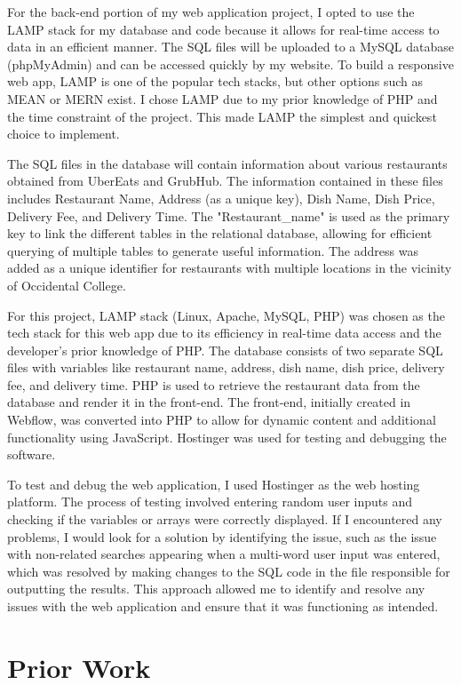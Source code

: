 \documentclass[10pt,twocolumn]{article}
\begin{document}
For the back-end portion of my web application project, I opted to use the LAMP stack for my database and code because it allows for real-time access to data in an efficient manner. The SQL files will be uploaded to a MySQL database (phpMyAdmin) and can be accessed quickly by my website. To build a responsive web app, LAMP is one of the popular tech stacks, but other options such as MEAN or MERN exist. I chose LAMP due to my prior knowledge of PHP and the time constraint of the project. This made LAMP the simplest and quickest choice to implement.

The SQL files in the database will contain information about various restaurants obtained from UberEats and GrubHub. The information contained in these files includes Restaurant Name, Address (as a unique key), Dish Name, Dish Price, Delivery Fee, and Delivery Time. The "Restaurant\_name" is used as the primary key to link the different tables in the relational database, allowing for efficient querying of multiple tables to generate useful information. The address was added as a unique identifier for restaurants with multiple locations in the vicinity of Occidental College.

For this project, LAMP stack (Linux, Apache, MySQL, PHP) was chosen as the tech stack for this web app due to its efficiency in real-time data access and the developer's prior knowledge of PHP. The database consists of two separate SQL files with variables like restaurant name, address, dish name, dish price, delivery fee, and delivery time. PHP is used to retrieve the restaurant data from the database and render it in the front-end. The front-end, initially created in Webflow, was converted into PHP to allow for dynamic content and additional functionality using JavaScript. Hostinger was used for testing and debugging the software.

To test and debug the web application, I used Hostinger as the web hosting platform. The process of testing involved entering random user inputs and checking if the variables or arrays were correctly displayed. If I encountered any problems, I would look for a solution by identifying the issue, such as the issue with non-related searches appearing when a multi-word user input was entered, which was resolved by making changes to the SQL code in the file responsible for outputting the results. This approach allowed me to identify and resolve any issues with the web application and ensure that it was functioning as intended.

\section{Prior Work}
\end{document}
